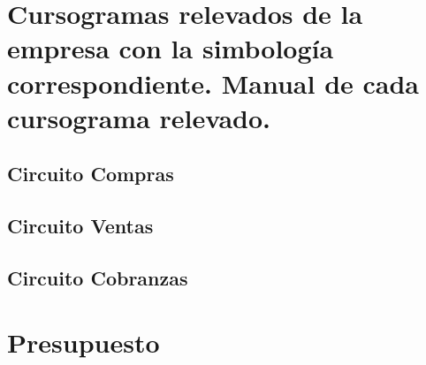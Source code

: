 \documentclass[12pt,titlepage]{report}
\begin{document}
\part{Cursogramas relevados de la empresa con la simbología correspondiente. Manual de cada cursograma relevado.}

\chapter{Circuito Compras}

\chapter{Circuito Ventas}

\chapter{Circuito Cobranzas}


\part{Presupuesto}

\end{document}
